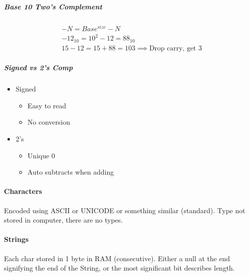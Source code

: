 \documentclass[12 pt]{article}
\begin{document}
	\subparagraph{Base 10 Two's Complement}
	\begin{align*}
		&-N = Base^{size}-N \\
		&-12_{10}=10^2-12=88_{10} \\
		&15-12=15+88=103 \implies \text{Drop carry, get }3
	\end{align*}
	\subparagraph{Signed vs 2's Comp}
	\begin{itemize}
		\item Signed \begin{itemize}
			\item Easy to read
			\item No conversion
		\end{itemize}
		\item 2's
		\begin{itemize}
			\item Unique 0
			\item Auto subtracts when adding
		\end{itemize} 
		\end{itemize}
	\paragraph{Characters} Encoded using ASCII or UNICODE or something similar (standard). Type not stored in computer, there are no types.
	\paragraph{Strings} Each char stored in 1 byte in RAM (consecutive). Either a null at the end signifying the end of the String, or the most significant bit describes length.
\end{document}
